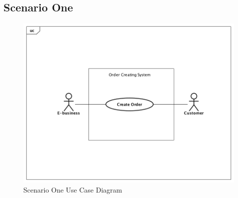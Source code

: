 \documentclass[12pt]{scrreprt}
\begin{document}
\subsection{Scenario One}
\begin{figure}[H]
  \centering\includegraphics[width=5in]{DocumentRes/1UseCaseDiagram.png}
  \caption{Scenario One Use Case Diagram}
\end{figure}
\end{document}
